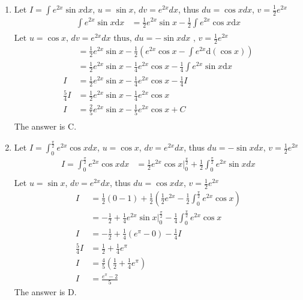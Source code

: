 \documentclass{article}
\numberwithin{equation}{section}
\begin{document}
\begin{enumerate}
    \item Let $\displaystyle I = \int e^{2x} \sin x \mathrm{d}x$, $u = \sin x$, $dv = e^{2x} dx$, thus $du = \cos x dx$, $v = \frac{1}{2}e^{2x}$
    \begin{align*}
        \int e^{2x} \sin x \mathrm{d}x & = \frac{1}{2} e^{2x} \sin x - \frac{1}{2} \int e^{2x} \cos x \mathrm{d}x \\
    \end{align*}
    $\text{Let } u=\cos x \text{, } dv = e^{2x}dx \text{ thus, } du = -\sin x dx \text{ , } v = \frac{1}{2}e^{2x}$
    \begin{align*}
        & = \frac{1}{2} e^{2x} \sin x - \frac{1}{2}\left(e^{2x} \cos x -\int e^{2x} \mathrm{d}(\cos x)\right) \\
        & = \frac{1}{2} e^{2x} \sin x - \frac{1}{4} e^{2x} \cos x -\frac{1}{4}\int e^{2x} \sin x \mathrm{d}x \\
        I & = \frac{1}{2} e^{2x} \sin x - \frac{1}{4} e^{2x} \cos x -\frac{1}{4}I \\
        \frac{5}{4} I & = \frac{1}{2} e^{2x} \sin x - \frac{1}{4} e^{2x} \cos x \\
        I & =  \frac{2}{5} e^{2x} \sin x - \frac{1}{5} e^{2x} \cos x + C \\
    \end{align*}
    The answer is C.

    \item Let $I = \displaystyle \int_{0}^{\frac{\pi}{2}} e^{2x}\cos x dx$, $u = \cos x$, $dv = e^{2x}dx$, thus $ du = -\sin x dx$, $v = \frac{1}{2}e^{2x}$
    \begin{align*}
        I = \int_{0}^{\frac{\pi}{2}} e^{2x}\cos x dx &= \frac{1}{2}e^{2x} \cos x \Big|_0^{\frac{\pi}{2}} + \frac{1}{2}\int_{0}^{\frac{\pi}{2}} e^{2x} \sin x dx\\
    \end{align*}
    Let $u = \sin x$, $dv = e^{2x}dx$, thus $du = \cos x dx$, $v = \frac{1}{2}e^{2x}$
    \begin{align*}
        I &= \frac{1}{2} (0-1) + \frac{1}{2} \left(\frac{1}{2}e^{2x} - \frac{1}{2}\int_{0}^{\frac{\pi}{2}} e^{2x}\cos x\right)\\
        &= -\frac{1}{2} + \frac{1}{4}e^{2x} \sin x \Big|_0^{\frac{\pi}{2}} - \frac{1}{4} \int_{0}^{\frac{\pi}{2}} e^{2x} \cos x\\
        I &= -\frac{1}{2} + \frac{1}{4}(e^\pi - 0) - \frac{1}{4} I\\
        \frac{5}{4} I &= \frac{1}{2} + \frac{1}{4}e^\pi\\
        I &= \frac{4}{5} \left(\frac{1}{2} + \frac{1}{4} e^\pi\right)\\
        I &= \frac{e^\pi - 2}{5}
    \end{align*}
    The answer is D.


\end{enumerate}
\end{document}
